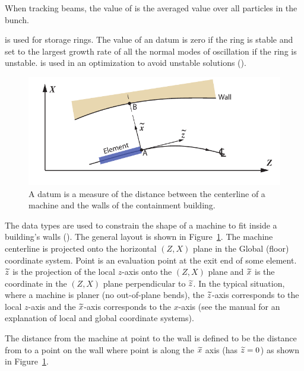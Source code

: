 \begin{description}
{When tracking beams, the value of  is the averaged
value over all particles in the bunch.

  \item[unstable.ring] \Newline
{} is used for storage rings. The value of an
 datum is zero if the ring is stable and set to the
largest growth rate of all the normal modes of oscillation if the ring
is unstable.  is used in an optimization to avoid
unstable solutions ().

\begin{figure}
  \centering
  \includegraphics[width=5in]{building-wall-constraint.pdf}
  \caption[Building wall datum]
{A  datum is a measure of the distance between the
centerline of a machine and the walls of the containment building.}
  \label{f:wall.constraint}
\end{figure}

  \item[wall.] \Newline
The  data types are used to constrain the shape of a machine
to fit inside a building's walls (). The general
layout is shown in Figure~\ref{f:wall.constraint}. The machine
centerline is projected onto the horizontal $(Z, X)$ plane in the
Global (floor) coordinate system. Point  is an evaluation point
at the exit end of some element. $\widetilde z$ is the projection of the
local $z$-axis onto the $(Z, X)$ plane and $\widetilde x$ is the coordinate
in the $(Z, X)$ plane perpendicular to $\widetilde z$. In the typical
situation, where a machine is planer (no out-of-plane bends), the $\widetilde
z$-axis corresponds to the local $z$-axis and the $\widetilde x$-axis
corresponds to the $x$-axis (see the \bmad manual for an explanation
of local and global coordinate systems).

The distance from the machine at point  to the wall is defined
to be the distance from  to a point  on the wall where
point  is along the $\widetilde x$ axis (has $\widetilde z = 0$) as shown in
Figure~\ref{f:wall.constraint}.

}
\end{description}
